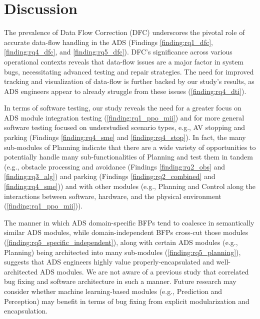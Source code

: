 \section{Discussion}\label{sec:discussion}

The prevalence of Data Flow Correction (DFC) underscores the pivotal role of accurate data-flow 
handling in the 
ADS (Findings \ref{finding:rq1_dfc}, \ref{finding:rq4_dfc},
and \ref{finding:rq5_dfc}). 
DFC's significance across various operational contexts reveals that data-flow issues are a major factor in system bugs, necessitating advanced testing and repair strategies. 
The need for improved tracking and visualization of 
data-flow
is further backed by our study's results, as ADS engineers appear to already struggle from these issues (\autoref{finding:rq4_dti}). 


In terms of software testing, our study reveals the need for a greater focus on ADS module integration testing (\autoref{finding:rq1_ppo_mii}) and for more general software testing focused on understudied scenario types, e.g., AV stopping and parking (Findings \ref{finding:rq4_sme} and \ref{finding:rq4_stop}). In fact, the many sub-modules of Planning indicate that there are a wide variety of opportunities to potentially handle many sub-functionalities of Planning and test them in tandem (e.g., obstacle processing and avoidance (Findings \ref{finding:rq2_obs} and \ref{finding:rq3_alg}) and parking (Findings \ref{finding:rq2_combined} and \ref{finding:rq4_sme})) and with other modules (e.g., Planning and Control along the interactions between software, hardware, and the physical environment (\autoref{finding:rq1_ppo_mii})).

The manner in which ADS domain-specific BFPs tend to coalesce in semantically similar ADS modules, while domain-independent BFPs cross-cut those modules (\autoref{finding:rq5_specific_independent}), along with certain ADS modules (e.g., Planning) being architected into many sub-modules (\autoref{finding:rq5_planning}), suggests that ADS engineers highly value properly-encapsulated and well-architected ADS modules. We are not aware of a previous study that correlated bug fixing and software architecture in such a manner. Future research may consider whether machine learning-based modules (e.g., Prediction and Perception) may benefit in terms of bug fixing from explicit modularization and encapsulation.


